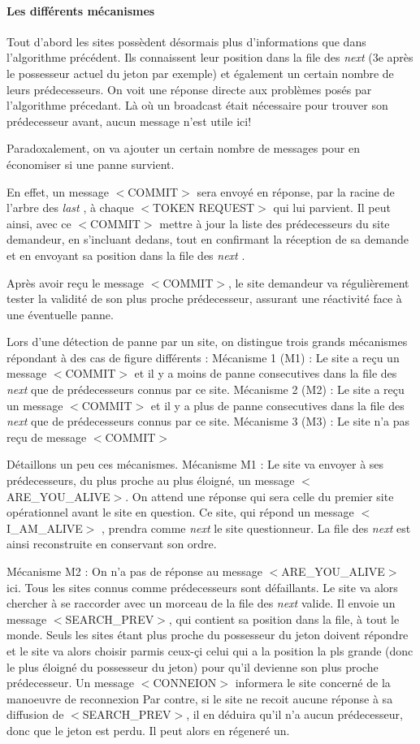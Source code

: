 \documentclass[a4paper,12pt]{article}
\newcommand{\last}{\textit{last} }
\newcommand{\next}{\textit{next} }
\begin{document}
\paragraph{Les différents mécanismes}
Tout d'abord les sites possèdent désormais plus d'informations que dans l'algorithme précédent. Ils connaissent leur position dans la file des \next (3e après le possesseur actuel du jeton par exemple) et également un certain nombre de leurs prédecesseurs. On voit une réponse directe aux problèmes posés par l'algorithme précedant. Là où un broadcast était nécessaire pour trouver son prédecesseur avant, aucun message n'est utile ici! 

Paradoxalement, on va ajouter un certain nombre de messages pour en économiser si une panne survient.

En effet, un message $<$COMMIT$>$ sera envoyé en réponse, par la racine de l'arbre des \last, à chaque $<$TOKEN REQUEST$>$ qui lui parvient. Il peut ainsi, avec ce $<$COMMIT$>$ mettre à jour la liste des prédecesseurs du site demandeur, en s'incluant dedans, tout en confirmant la réception de sa demande et en envoyant sa position dans la file des \next.

Après avoir reçu le message $<$COMMIT$>$, le site demandeur va régulièrement tester la validité de son plus proche prédecesseur, assurant une réactivité face à une éventuelle panne.


Lors d'une détection de panne par un site, on distingue trois grands mécanismes répondant à des cas de figure différents : 
Mécanisme 1 (M1) : Le site a reçu un message $<$COMMIT$>$ et il y a moins de panne consecutives dans la file des \next que de prédecesseurs connus par ce site. 
Mécanisme 2 (M2) : Le site a reçu un message $<$COMMIT$>$ et il y a plus de panne consecutives dans la file des \next que de prédecesseurs connus par ce site.
Mécanisme 3 (M3) : Le site n'a pas reçu de message $<$COMMIT$>$

Détaillons un peu ces mécanismes.
Mécanisme M1 : Le site va envoyer à ses prédecesseurs, du plus proche au plus éloigné, un message $<$ARE\_YOU\_ALIVE$>$. On attend une réponse qui sera celle du premier site opérationnel avant le site en question. Ce site, qui répond un message $<$I\_AM\_ALIVE$>$ , prendra comme \next le site 
questionneur. La file des \next est ainsi reconstruite en conservant son ordre.

Mécanisme M2 : On n'a pas de réponse au message $<$ARE\_YOU\_ALIVE$>$ ici. Tous les sites connus comme prédecesseurs sont défaillants. Le site va alors chercher à se raccorder avec un morceau de la file des \next valide. Il envoie un message $<$SEARCH\_PREV$>$, qui contient sa position dans la file, à tout le monde.
Seuls les sites étant plus proche du possesseur du jeton doivent répondre et le site va alors choisir parmis ceux-çi celui qui a la position la pls grande (donc le plus éloigné du possesseur du jeton) pour qu'il devienne son plus proche prédecesseur. Un message $<$CONNEION$>$ informera le site concerné de la manoeuvre de reconnexion
Par contre, si le site ne recoit aucune réponse à sa diffusion de $<$SEARCH\_PREV$>$, il en déduira qu'il n'a aucun prédecesseur, donc que le jeton est perdu. Il peut alors en régeneré un.
\end{document}
